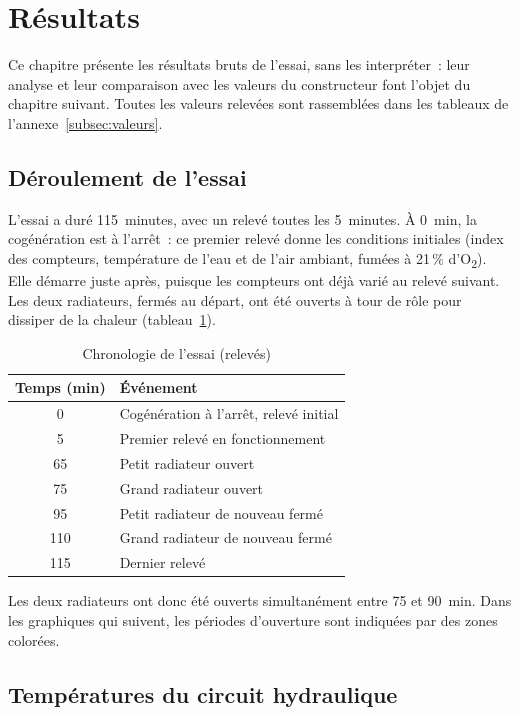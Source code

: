 \section{Résultats}
\label{sec:resultats}

Ce chapitre présente les résultats bruts de l'essai, sans les interpréter~: leur analyse et leur comparaison avec les valeurs du constructeur font l'objet du chapitre suivant. Toutes les valeurs relevées sont rassemblées dans les tableaux de l'annexe~\ref{subsec:valeurs}.

\subsection{Déroulement de l'essai}
\label{subsec:deroulement}

L'essai a duré 115~minutes, avec un relevé toutes les 5~minutes. À 0~min, la cogénération est à l'arrêt~: ce premier relevé donne les conditions initiales (index des compteurs, température de l'eau et de l'air ambiant, fumées à 21\,\% d'O\textsubscript{2}). Elle démarre juste après, puisque les compteurs ont déjà varié au relevé suivant. Les deux radiateurs, fermés au départ, ont été ouverts à tour de rôle pour dissiper de la chaleur (tableau~\ref{tab:evenements}).

\begin{table}[htbp]
  \centering
  \caption{Chronologie de l'essai (relevés)}
  \label{tab:evenements}
  \begin{tabular}{cl}
    \hline
    Temps (min) & Événement \\
    \hline
    0 & Cogénération à l'arrêt, relevé initial \\
    5 & Premier relevé en fonctionnement \\
    65 & Petit radiateur ouvert \\
    75 & Grand radiateur ouvert \\
    95 & Petit radiateur de nouveau fermé \\
    110 & Grand radiateur de nouveau fermé \\
    115 & Dernier relevé \\
    \hline
  \end{tabular}
\end{table}

Les deux radiateurs ont donc été ouverts simultanément entre 75 et 90~min. Dans les graphiques qui suivent, les périodes d'ouverture sont indiquées par des zones colorées.

\subsection{Températures du circuit hydraulique}
\label{subsec:res-temperatures}

